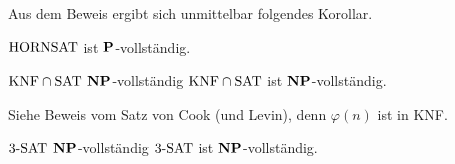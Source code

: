 \linie

\begin{Bem}
    Aus dem Beweis ergibt sich unmittelbar folgendes Korollar.
\end{Bem}

\begin{Kor}
    $\HORNSAT$ ist $\P$-vollständig.
\end{Kor}

\linie

\begin{Satz}{$\KNF \cap \SAT$ $\NP$-vollständig}
    $\KNF \cap \SAT$ ist $\NP$-vollständig.
\end{Satz}

\begin{Beweis}
    Siehe Beweis vom Satz von Cook (und Levin),
    denn $\varphi(n)$ ist in KNF.
\end{Beweis}

\linie
\pagebreak

\begin{Satz}{$\kSAT{3}$ $\NP$-vollständig}
    $\kSAT{3}$ ist $\NP$-vollständig.
\end{Satz}


